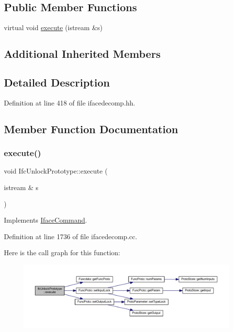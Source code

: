 \subsection*{Public Member Functions}
\begin{DoxyCompactItemize}
\item 
virtual void \mbox{\hyperlink{class_ifc_unlock_prototype_ac21154c70e24fd3ba2e7d71d254c9b85}{execute}} (istream \&s)
\end{DoxyCompactItemize}
\subsection*{Additional Inherited Members}


\subsection{Detailed Description}


Definition at line 418 of file ifacedecomp.\+hh.



\subsection{Member Function Documentation}
\mbox{\label{class_ifc_unlock_prototype_ac21154c70e24fd3ba2e7d71d254c9b85}} 
\subsubsection{\texorpdfstring{execute()}{execute()}}
{\footnotesize\ttfamily void Ifc\+Unlock\+Prototype\+::execute (\begin{DoxyParamCaption}\item[{istream \&}]{s }\end{DoxyParamCaption})\hspace{0.3cm}{\ttfamily [virtual]}}



Implements \mbox{\hyperlink{class_iface_command_af10e29cee2c8e419de6efe9e680ad201}{Iface\+Command}}.



Definition at line 1736 of file ifacedecomp.\+cc.

Here is the call graph for this function\+:
\nopagebreak
\begin{figure}[H]
\begin{center}
\leavevmode
\includegraphics[width=350pt]{class_ifc_unlock_prototype_ac21154c70e24fd3ba2e7d71d254c9b85_cgraph}
\end{center}
\end{figure}


